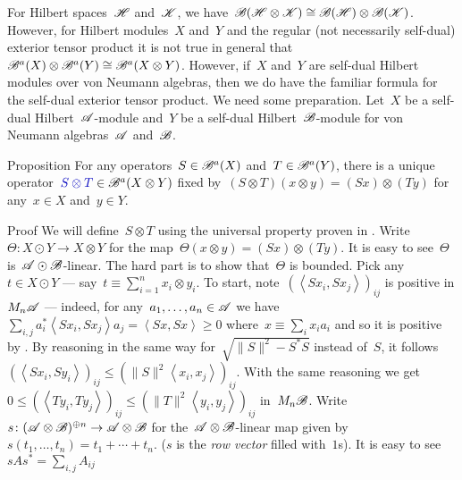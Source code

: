 \documentclass[b]{subfiles}
\begin{document}
\begin{parsec}%
\begin{point}%
For Hilbert spaces~$\mathscr{H}$ and~$\mathscr{K}$,
    we have~$\mathscr{B}(\mathscr{H} \otimes \mathscr{K})
        \cong \mathscr{B}(\mathscr{H}) \otimes \mathscr{B}(\mathscr{K})$.
However, for Hilbert modules~$X$ and~$Y$
    and the regular (not necessarily self-dual)
        exterior tensor product
        it is not true in general
        that~$\mathscr{B}^a(X) \otimes \mathscr{B}^a(Y) \cong \mathscr{B}^a(X \otimes Y)$.
However, if~$X$ and~$Y$ are self-dual Hilbert modules over von Neumann
    algebras, then we do have the familiar formula
    for the self-dual exterior tensor product.
We need some preparation.
Let~$X$ be a self-dual Hilbert~$\mathscr{A}$-module
    and~$Y$ be a self-dual Hilbert~$\mathscr{B}$-module
    for von Neumann algebras~$\mathscr{A}$ and~$\mathscr{B}$.
\end{point}
\begin{point}{Proposition}%
For any operators~$S \in \mathscr{B}^a(X)$ and~$T \in \mathscr{B}^a(Y)$,
    there is a unique operator~$\Define{S \otimes T} \in \scrB^a(X\otimes Y)$
    fixed by~$(S \otimes T) (x \otimes y) = (S x) \otimes (T y)$
    for any~$x\in X$ and~$y \in Y$.
\begin{point}{Proof}%
We will define~$S \otimes T$ using the universal
    property proven in .
Write~$\Theta \colon X \odot Y \to X \otimes Y$
    for the map~$\Theta(x \otimes y) = (Sx) \otimes (Ty)$.
It is easy to see~$\Theta$ is~$\mathscr{A} \odot \mathscr{B}$-linear.
The hard part is to show that~$\Theta$ is bounded.
Pick any~$t \in X \odot Y$ --- say~$t \equiv \sum^n_{i=1} x_i \otimes y_i$.
To start, note~$(\left<Sx_i, Sx_j\right>)_{ij}$ is positive in $M_n \mathscr{A}$ ---
    indeed, for any~$a_1, \ldots, a_n \in \mathscr{A}$
    we have~$\sum_{i,j} a_i^* \left<S x_i, S x_j\right> a_j
            = \left<Sx,Sx\right> \geq 0$
                where~$x \equiv \sum_i x_i a_i$
                and so it is positive
                by .
By reasoning in the same way for~$\sqrt{\|S\|^2 - S^*S}$
instead of~$S$,
it follows~$(\left<Sx_i, Sy_i \right>)_{ij} \leq (\|S\|^2 \left<x_i,x_j\right>)_{ij}$.
With the same reasoning we
get~$0 \leq (\left<Ty_i, Ty_j\right>)_{ij} \leq (\|T\|^2 \left<y_i, y_j\right>)_{ij}$ in~$M_n \mathscr{B}$.
Write~$s\colon (\mathscr{A} \otimes \mathscr{B})^{\oplus n} \to \mathscr{A} \otimes \mathscr{B}$
    for the~$\mathscr{A} \otimes \mathscr{B}$-linear map
    given by~$s(t_1, \ldots, t_n) = t_1 + \cdots + t_n$.
    ($s$ is the \emph{row vector} filled with~$1$s).
It is easy to see~$s A s^* = \sum_{i,j} A_{ij}$

\end{point}
\end{point}
\end{parsec}
\end{document}
